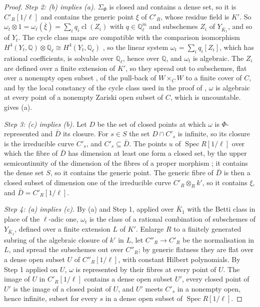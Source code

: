 \documentclass[11pt,reqno]{amsart}
\theoremstyle{plain}
\theoremstyle{definition}
\theoremstyle{remark}
\newcommand{\QQ}{\mathbb{Q}}
\DeclareMathOperator{\Spec}{Spec}
\begin{document}
\begin{proof}
\emph{Step 2: (b) implies (a).} $\Sigma_{\Phi}$ is closed and contains a dense
set, so it is $C'_{R}[1/\ell]$ and contains the generic point $\xi$ of
$C'_{R}$, whose residue field is $K'$. So $\omega_{t}\otimes1=
\omega_{\ell}(\bar\xi)=\sum_{i}q_{i}\operatorname{cl}(Z_{i})$ with
$q\in\QQ_{\ell}^{m}$ and subschemes $Z_{i}$ of $Y_{\bar{K}_{1}}$, and so of
$Y_{t}$. The cycle class maps are compatible with the comparison isomorphism
$H^{4}(Y_{t},\QQ)\otimes\QQ_{\ell}\cong H^{4}(Y_{t},\QQ_{\ell})$
\cite[Section~1 and Example~2.1(a)]{Del82}, so the linear system
$\omega_{t}=\sum_{i}q_{i}[Z_{i}]$, which has rational coefficients, is
solvable over $\QQ_{\ell}$, hence over $\QQ$, and $\omega_{t}$ is algebraic.
The $Z_{i}$ are defined over a finite extension of $K'$, so they spread out to
subschemes, flat over a nonempty open subset \cite[Tag~052A]{Stacks}, of the
pull-back of $W\times_{C}W$ to a finite cover of $C$, and by the local
constancy of the cycle class used in the proof of \cite[Theorem~16.4]{paperI},
$\omega$ is algebraic at every point of a nonempty Zariski open subset of $C$,
which is uncountable.  gives (a).

\emph{Step 3: (c) implies (b).} Let $D$ be the set of closed points at which
$\omega$ is $\Phi$-represented and $\bar{D}$ its closure. For $s\in S$ the set
$D\cap C'_{s}$ is infinite, so its closure is the irreducible curve $C'_{s}$,
and $C'_{s}\subseteq\bar{D}$. The points $u$ of $\Spec R[1/\ell]$ over which
the fibre of $\bar{D}$ has dimension at least one form a closed set, by the
upper semicontinuity of the dimension of the fibres of a proper morphism
\cite[Tag~0D4I]{Stacks}; it contains the dense set $S$, so it contains the
generic point. The generic fibre of $\bar{D}$ is then a closed subset of
dimension one of the irreducible curve $C'_{R}\otimes_{R}k'$, so it contains
$\xi$, and $\bar{D}=C'_{R}[1/\ell]$.

\emph{Step 4: (a) implies (c).} By (a) and Step 1, applied over $\bar{K}_{1}$
with the Betti class in place of the $\ell$-adic one, $\omega_{t}$ is the
class of a rational combination of subschemes of $Y_{\bar{K}_{1}}$, defined
over a finite extension $L$ of $K'$. Enlarge $R$ to a finitely generated
subring of the algebraic closure of $k'$ in $L$, let $C''_{R}\to C'_{R}$ be the
normalisation in $L$, and spread the subschemes out over $C''_{R}$; by generic
flatness \cite[Tag~052A]{Stacks} they are flat over a dense open subset $U$ of
$C''_{R}[1/\ell]$, with constant Hilbert polynomials. By Step 1 applied on $U$,
$\omega$ is represented by their fibres at every point of $U$. The image of $U$
in $C'_{R}[1/\ell]$ contains a dense open subset $U'$, every closed point of
$U'$ is the image of a closed point of $U$, and $U'$ meets $C'_{s}$ in a
nonempty open, hence infinite, subset for every $s$ in a dense open subset of
$\Spec R[1/\ell]$.


\end{proof}
\end{document}
